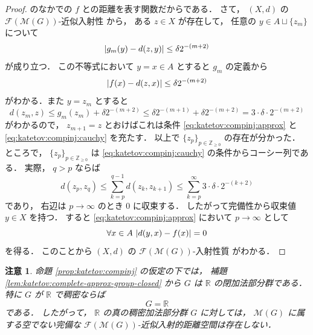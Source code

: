 \documentclass[leqno, 12pt]{jsarticle}
\newtheorem*{rmk}{注意}
\newcommand{\zz}{\mathbb{Z}}
\newcommand{\yozz}[1]{\zz_{\ge #1}}
\newcommand{\rr}{\mathbb{R}}
\DeclarePairedDelimiter{\abs}{\lvert}{\rvert}
\newcommand{\Met}[1]{\mathscr{M}(#1)}
\newcommand{\FinitePart}[1]{\mathscr{F}(#1)}
\newcommand{\FinMet}[1]{\FinitePart{\Met{#1}}}
\begin{document}
\begin{proof}
のなかでの
$f$
との距離を表す関数だからである．
さて，
$(X, d)$
の
$\FinMet{G}$-近似入射性
から，
ある
$z\in X$
が存在して，
任意の
$y\in A\sqcup\{z_{m}\}$
について
\[
\abs{g_{m}(y)-d(z, y)}\le \delta2^{-(m+2)}
\]
が成り立つ．
この不等式において
$y=x\in A$
とすると
$g_{m}$%
の定義から
\[
\abs{f(x)-d(z,x)}\le \delta2^{-(m+2)}
\]
がわかる．また
$y=z_{m}$
とすると
\[
d(z_{m}, z)
\le g_{m}(z_{m})+\delta2^{-(m+2)}
\le \delta2^{-(m+1)}+\delta2^{-(m+2)}
=3\cdot \delta\cdot 2^{-(m+2)}
\]
がわかるので，
$z_{m+1}=z$%
とおけばこれは条件
\eqref{eq:katetov:compinj:approx}%
と
\eqref{eq:katetov:compinj:cauchy}%
を充たす．
以上で
$\{z_{p}\}_{p\in\yozz{0}}$%
の存在が分かった．
ところで，
$\{z_{p}\}_{p\in \yozz{0}}$
は
\eqref{eq:katetov:compinj:cauchy}
の条件からコーシー列である．
実際，
$q>p$
ならば
\[
d(z_p,z_q)
\le \sum_{k=p}^{q-1}d(z_k,z_{k+1})
\le \sum_{k=p}^{\infty}3\cdot \delta\cdot 2^{-(k+2)}
\]
であり，
右辺は
$p\to\infty$
のとき
$0$
に収束する．
したがって完備性から収束値
$y\in X$%
を持つ．
すると
\eqref{eq:katetov:compinj:approx}
において
$p\to \infty$%
として
\[
\forall x\in A\ \abs{d(y, x)-f(x)}=0
\]
を得る．
このことから
$(X, d)$
の
$\FinMet{G}$-入射性質
がわかる．
\end{proof}


\begin{rmk}\label{rmk:katetov:completion-group}
命題
\ref{prop:katetov:compinj}
の仮定の下では，
補題
\ref{lem:katetov:complete-approx-group-closed}
から
$G$
は
$\rr$
の閉加法部分群である．
特に
$G$
が
$\rr$
で稠密ならば
\[
G=\rr
\]
である．
したがって，
$\rr$
の真の稠密加法部分群
$G$
に対しては，
$\Met{G}$
に属する空でない完備な
$\FinMet{G}$-近似入射的距離空間は存在しない．
\end{rmk}
\end{document}
